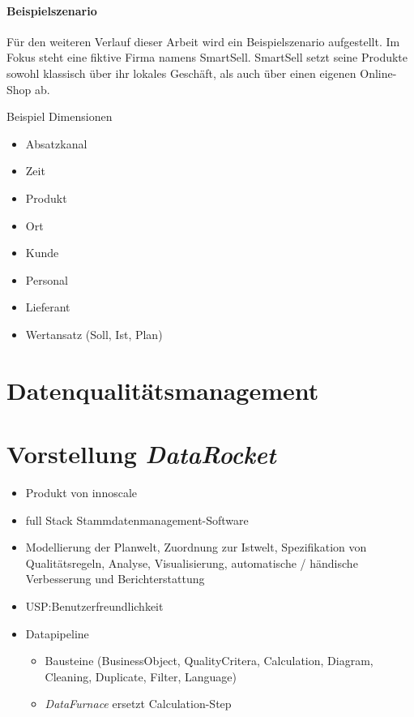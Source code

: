 \documentclass[
  language=german, %
  type=bachelor%
]{isthesis}
\begin{document}
\begin{content}
  \paragraph{Beispielszenario}
  Für den weiteren Verlauf dieser Arbeit wird ein Beispielszenario aufgestellt. Im
  Fokus steht eine fiktive Firma namens SmartSell. SmartSell setzt seine
  Produkte sowohl klassisch über ihr lokales Geschäft, als auch über einen
  eigenen Online-Shop ab.

  Beispiel Dimensionen
  \begin{itemize}
    \item Absatzkanal
    \item Zeit
    \item Produkt
    \item Ort
    \item Kunde
    \item Personal
    \item Lieferant
    \item Wertansatz (Soll, Ist, Plan)
  \end{itemize}

  \section{Datenqualitätsmanagement}

  \section{Vorstellung \textit{DataRocket}}
\label{sec:Vorstellung-DataRocket}
  \begin{itemize}
    \item Produkt von innoscale
    \item full Stack Stammdatenmanagement-Software
    \item Modellierung der Planwelt, Zuordnung zur Istwelt, Spezifikation von
      Qualitätsregeln, Analyse, Visualisierung, automatische / händische
      Verbesserung und Berichterstattung
    \item USP:\@ Benutzerfreundlichkeit 
    \item Datapipeline
      \begin{itemize}
        \item Bausteine (BusinessObject, QualityCritera, Calculation, Diagram,
          Cleaning, Duplicate, Filter, Language)
        \item \textit{DataFurnace} ersetzt Calculation-Step
      \end{itemize}
  \end{itemize}



\end{content}
\end{document}
